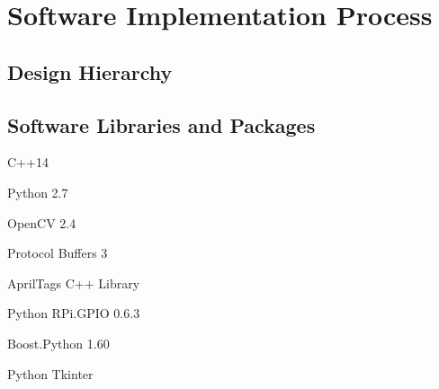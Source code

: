 
\section{Software Implementation Process}
\label{sec:software_implementation}

\subsection{Design Hierarchy}
\label{sec:software_design}

\subsection{Software Libraries and Packages}
\label{sec:software_libraries}
\item C++14
\item Python 2.7 \cite{python27}
\item OpenCV 2.4 \cite{opencv24}
\item Protocol Buffers 3 \cite{protobuf3}
\item AprilTags C++ Library \cite{apriltags}
\item Python RPi.GPIO 0.6.3 \cite{python_rpigpio}
\item Boost.Python 1.60 \cite{python_boost}
\item Python Tkinter \cite{python_tkinter}










